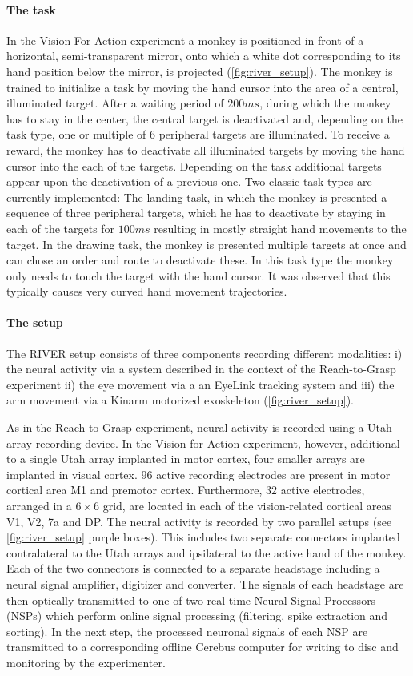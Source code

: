 \paragraph{The task}
In the Vision-For-Action experiment a monkey is positioned in front of a horizontal, semi-transparent mirror, onto which a white dot corresponding to its hand position below the mirror, is projected (\cref{fig:river_setup}). The monkey is trained to initialize a task by moving the hand cursor into the area of a central, illuminated target. After a waiting period of $200ms$, during which the monkey has to stay in the center, the central target is deactivated and, depending on the task type, one or multiple of 6 peripheral targets are illuminated. To receive a reward, the monkey has to deactivate all illuminated targets by moving the hand cursor into the each of the targets. Depending on the task additional targets appear upon the deactivation of a previous one. Two classic task types are currently implemented: The landing task, in which the monkey is presented a sequence of three peripheral targets, which he has to deactivate by staying in each of the targets for $100ms$ resulting in mostly straight hand movements to the target. In the drawing task, the monkey is presented multiple targets at once and can chose an order and route to deactivate these. In this task type the monkey only needs to touch the target with the hand cursor. It was observed that this typically causes very curved hand movement trajectories.


\paragraph{The setup}
The RIVER setup consists of three components recording different modalities: i) the neural activity via a  system described in the context of the Reach-to-Grasp experiment ii) the eye movement via a an EyeLink tracking system and iii) the arm movement via a Kinarm motorized exoskeleton (\cref{fig:river_setup}).

As in the Reach-to-Grasp experiment, neural activity is recorded using a Utah array recording device. In the Vision-for-Action experiment, however, additional to a single Utah array implanted in motor cortex, four smaller arrays are implanted in visual cortex.  $96$ active recording electrodes are present in motor cortical area M1 and premotor cortex. Furthermore, $32$ active electrodes, arranged in a $6\times6$ grid, are located in each of the vision-related cortical areas V1, V2, 7a and DP. The neural activity is recorded by two parallel setups (see \cref{fig:river_setup} purple boxes). This includes two separate connectors implanted contralateral to the Utah arrays and ipsilateral to the active hand of the monkey. Each of the two connectors is connected to a separate headstage including a neural signal amplifier, digitizer and converter. The signals of each headstage are then optically transmitted to one of two real-time Neural Signal Processors (NSPs) which perform online signal processing (filtering, spike extraction and sorting). In the next step, the processed neuronal signals of each NSP are transmitted to a corresponding offline Cerebus computer for writing to disc and monitoring by the experimenter.

